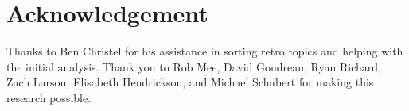 

\section*{Acknowledgement}
Thanks to Ben Christel for his assistance in sorting retro topics and helping with the initial analysis. Thank you to Rob Mee, David Goudreau, Ryan Richard, Zach Larson, Elisabeth Hendrickson, and Michael Schubert for making this research possible.


